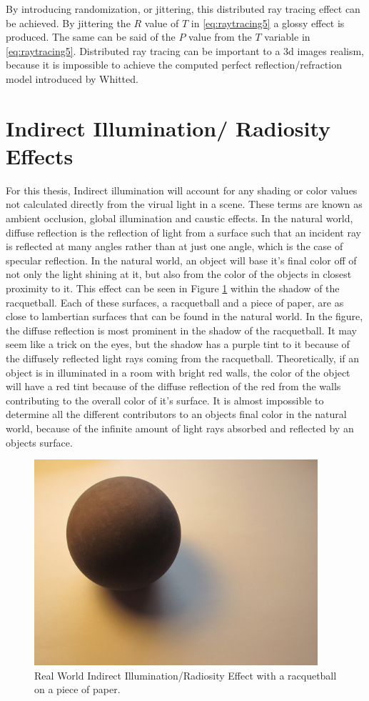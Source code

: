By introducing randomization, or jittering, this distributed ray tracing effect can be achieved. By jittering the ${R}$ value of $T$ in \ref{eq:raytracing5} \space a glossy effect is produced. The same can be said of the $P$ value from the $T$ variable in \ref{eq:raytracing5}.  Distributed ray tracing can be important to a 3d images realism, because it is impossible to achieve the computed perfect reflection/refraction model introduced by Whitted.

\section{Indirect Illumination/ Radiosity Effects}
For this thesis, Indirect illumination will account for any shading or color values not calculated directly from the virual light in a scene.   These terms are known as ambient occlusion, global illumination and caustic effects.
In the natural world, diffuse reflection is the reflection of light from a surface such that an incident ray is reflected at many angles rather than at just one angle, which is the case of specular reflection.  In the natural world, an object will base it's final color off of not only the light shining at it, but also from the color of the objects in closest proximity to it.  This effect can be seen in Figure \ref{fig:diffusereflectionrw} within the shadow of the racquetball.  Each of these surfaces, a racquetball and a piece of paper, are as close to lambertian surfaces that can be found in the natural world.  In the figure, the diffuse reflection is most prominent in the shadow of the racquetball.  It may seem like a trick on the eyes, but the shadow has a purple tint to it because of the diffusely reflected light rays coming from the racquetball.  Theoretically, if an object is in illuminated in a room with bright red walls, the color of the object will have a red tint because of the diffuse reflection of the red from the walls contributing to the overall color of it's surface.  It is almost impossible to determine all the different contributors to an objects final color in the natural world, because of the infinite amount of light rays absorbed and reflected by an objects surface.

\begin{figure}[h]
\centering
\includegraphics[height=3.0in]{figures/raquetball.JPG}
\caption{Real World Indirect Illumination/Radiosity Effect with a racquetball on a piece of paper.}
\label{fig:diffusereflectionrw}
\end{figure}

